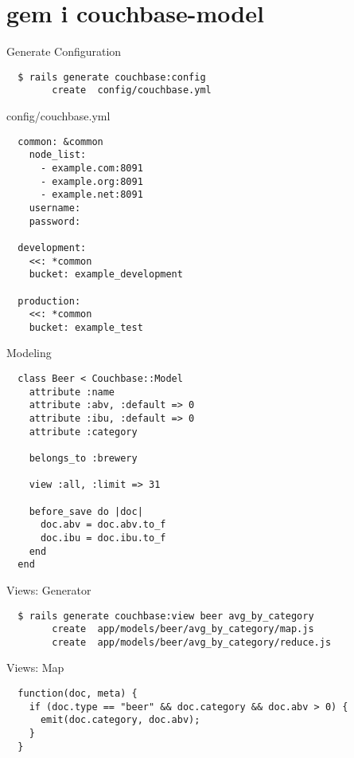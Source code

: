 \documentclass[aspectratio=43,handout]{beamer}
\begin{document}
\section{gem i couchbase-model}
\begin{frame}[fragile]{Generate Configuration}
  \begin{verbatim}
  $ rails generate couchbase:config
        create  config/couchbase.yml
  \end{verbatim}
\end{frame}

\begin{frame}[fragile]{config/couchbase.yml}
  \begin{verbatim}
  common: &common
    node_list:
      - example.com:8091
      - example.org:8091
      - example.net:8091
    username:
    password:

  development:
    <<: *common
    bucket: example_development

  production:
    <<: *common
    bucket: example_test
  \end{verbatim}
\end{frame}

\begin{frame}[fragile]{Modeling}
  \begin{verbatim}
  class Beer < Couchbase::Model
    attribute :name
    attribute :abv, :default => 0
    attribute :ibu, :default => 0
    attribute :category

    belongs_to :brewery

    view :all, :limit => 31

    before_save do |doc|
      doc.abv = doc.abv.to_f
      doc.ibu = doc.ibu.to_f
    end
  end
  \end{verbatim}
\end{frame}

\begin{frame}[fragile]{Views: Generator}
  \begin{verbatim}
  $ rails generate couchbase:view beer avg_by_category
        create  app/models/beer/avg_by_category/map.js
        create  app/models/beer/avg_by_category/reduce.js
  \end{verbatim}
\end{frame}

\begin{frame}[fragile]{Views: Map}
  \begin{verbatim}
  function(doc, meta) {
    if (doc.type == "beer" && doc.category && doc.abv > 0) {
      emit(doc.category, doc.abv);
    }
  }
  \end{verbatim}
\end{frame}
\end{document}
